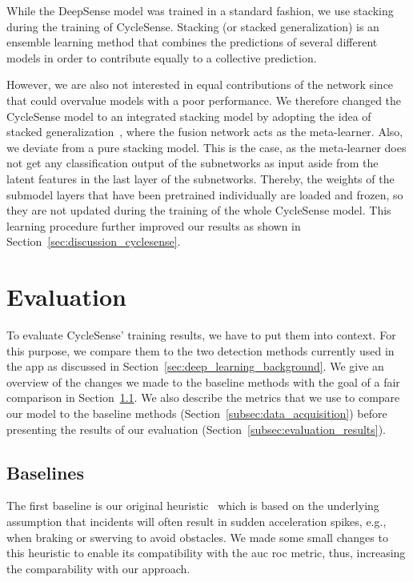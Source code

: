 While the DeepSense model was trained in a standard fashion, we use stacking during the training of CycleSense.
Stacking (or stacked generalization) is an ensemble learning method that combines the predictions of several different models in order to contribute equally to a collective prediction.

However, we are also not interested in equal contributions of the network since that could overvalue models with a poor performance.
We therefore changed the CycleSense model to an integrated stacking model by adopting the idea of stacked generalization~\cite{wolpert1992stacked}, where the fusion network acts as the meta-learner.
Also, we deviate from a pure stacking model.
This is the case, as the meta-learner does not get any classification output of the subnetworks as input aside from the latent features in the last layer of the subnetworks.
Thereby, the weights of the submodel layers that have been pretrained individually are loaded and frozen, so they are not updated during the training of the whole CycleSense model.
This learning procedure further improved our results as shown in Section~\ref{sec:discussion_cyclesense}.

\section{Evaluation}
\label{sec:evaluation_cyclesense}
To evaluate CycleSense' training results, we have to put them into context. 
For this purpose, we compare them to the two detection methods currently used in the app as discussed in Section~\ref{sec:deep_learning_background}.
We give an overview of the changes we made to the baseline methods with the goal of a fair comparison in Section~\ref{subsec:baselines}.
We also describe the metrics that we use to compare our model to the baseline methods (Section~\ref{subsec:data_acquisition}) before presenting the results of our evaluation (Section~\ref{subsec:evaluation_results}).


\subsection{Baselines}
\label{subsec:baselines}
The first baseline is our original heuristic~\cite{karakaya2020simra} which is based on the underlying assumption that incidents will often result in sudden acceleration spikes, e.g., when braking or swerving to avoid obstacles.
We made some small changes to this heuristic to enable its compatibility with the \ac{auc} \ac{roc} metric, thus, increasing the comparability with our approach.


